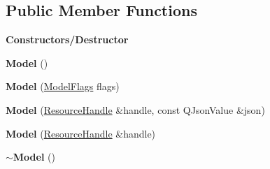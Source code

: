 \subsection*{Public Member Functions}
\begin{Indent}\textbf{ Constructors/\+Destructor}\par
\begin{DoxyCompactItemize}
\item 
\mbox{\label{classrev_1_1_model_a6a3b7200f5478246ce7a12bd2ea79bc8}} 
{\bfseries Model} ()
\item 
\mbox{\label{classrev_1_1_model_a05a84ad970be8f90441edac98bd43552}} 
{\bfseries Model} (\mbox{\hyperlink{classrev_1_1_flags}{Model\+Flags}} flags)
\item 
\mbox{\label{classrev_1_1_model_a004b3433eebc155d3db45ab7bcf92e7e}} 
{\bfseries Model} (\mbox{\hyperlink{classrev_1_1_resource_handle}{Resource\+Handle}} \&handle, const Q\+Json\+Value \&json)
\item 
\mbox{\label{classrev_1_1_model_a667aecda3fee184b56a0e350e7a53772}} 
{\bfseries Model} (\mbox{\hyperlink{classrev_1_1_resource_handle}{Resource\+Handle}} \&handle)
\item 
\mbox{\label{classrev_1_1_model_a094832b94c5d399ee5c9effdc1d0892a}} 
{\bfseries $\sim$\+Model} ()
\end{DoxyCompactItemize}
\end{Indent}
